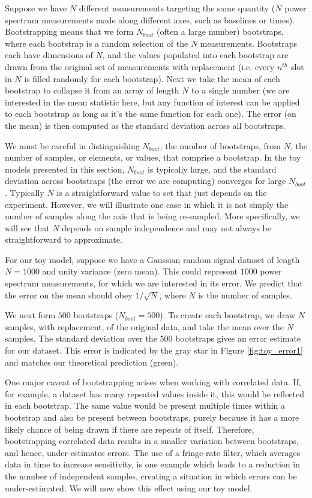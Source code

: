 \documentclass[preprint2,numberedappendix,tighten]{aastex6}  %
\begin{document}
Suppose we have $N$ different measurements targeting the same quantity ($N$ power spectrum measurements made along different axes, such as baselines or times). 
Bootstrapping means that we form $N_{boot}$ (often a large number) bootstraps, where each bootstrap is a random selection 
of the $N$ measurements. Bootstraps each have dimensions of $N$, and the values populated into each bootstrap are drawn 
from the original set of measurements with replacement (i.e. every $n^{th}$ slot in $N$ is filled randomly for each bootstrap). Next we take 
the mean of each bootstrap to collapse it from an array of length $N$ to a single number (we are interested in the mean statistic 
here, but any function of interest can be applied to each bootstrap as long as it's the same function for each one). The error (on 
the mean) is then computed as the standard deviation across all bootstraps. 

We must be careful in distinguishing $N_{boot}$, the number of bootstraps, from $N$, the number of samples, or elements, or 
values, that comprise a bootstrap. In the toy models presented in this section, $N_{boot}$ is typically large, and the standard 
deviation across bootstraps (the error we are computing) converges for large $N_{boot}$. Typically $N$ is a straightforward value to set that just depends on the experiment. However, we will illustrate one case in which it is not simply the number of samples along the axis that is being re-sampled. More specifically, we will see that $N$ depends on sample independence and may not always be straightforward to approximate. 

For our toy model, suppose we have a Gaussian random signal dataset of length $N=1000$ and unity variance (zero mean). 
This could represent $1000$ power spectrum measurements, for which we are interested in its error. We predict that the error 
on the mean should obey $1/\sqrt{N}$, where $N$ is the number of samples.

We next form $500$ bootstraps ($N_{boot} = 500$). To create each bootstrap, we draw $N$ samples, with replacement, of the 
original data, and take the mean over the $N$ samples. The standard deviation over the $500$ bootstraps gives an error 
estimate for our dataset. This error is indicated by the gray star in Figure \ref{fig:toy_error1} and matches our theoretical 
prediction (green).

One major caveat of bootstrapping arises when working with correlated data. If, for example, a dataset has many repeated 
values inside it, this would be reflected in each bootstrap. The same value would be present multiple times within a bootstrap 
and also be present between bootstraps, purely because it has a more likely chance of being drawn if there are repeats of 
itself. Therefore, bootstrapping correlated data results in a smaller variation between bootstraps, and hence, under-estimates 
errors. The use of a fringe-rate filter, which averages data in time to increase sensitivity, is one example which leads to a 
reduction in the number of independent samples, creating a situation in which errors can be under-estimated. We will now show 
this effect using our toy model.
\end{document}
